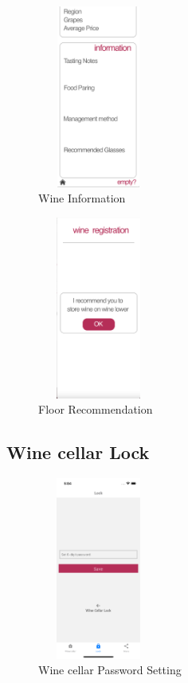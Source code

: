 \documentclass[sigconf, nonacm]{acmart}
\begin{document}
\begin{figure}
  \centering
  \includegraphics[width=4cm, height=6cm]{wineinfo2.png}
  \caption{Wine Information}
  \label{fig:My Winecellar}
\end{figure}

\begin{figure}
  \centering
  \includegraphics[width=4cm, height=6cm]{infocheck.png}
  \caption{Floor Recommendation}
  \label{fig:My Winecellar}
\end{figure}

\noindent \subsection{Wine cellar Lock}
\begin{figure}
  \centering
  \includegraphics[width=4cm, height=6cm]{2. WineCellarPasswdSetting.png}
  \caption{Wine cellar Password Setting}
  \label{fig:wine cellar lock setup}
\end{figure}
\end{document}

